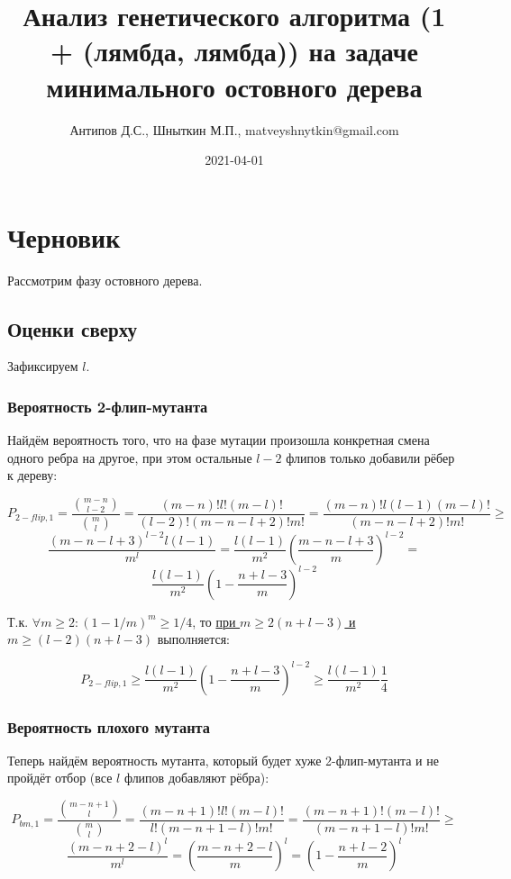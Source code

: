 \documentclass{article}
\title{Анализ генетического алгоритма (1 + (лямбда, лямбда)) на задаче минимального остовного дерева}
\date{2021-04-01}
\author{Антипов Д.С., Шныткин М.П., matveyshnytkin@gmail.com}
\begin{document}
  \maketitle
  \newpage
  

  \section{Черновик}
  
Рассмотрим фазу остовного дерева.

  \subsection{Оценки сверху}

Зафиксируем $l$.

  \subsubsection{Вероятность 2-флип-мутанта}

Найдём вероятность того, что на фазе мутации произошла конкретная смена одного ребра на другое, при этом остальные $l - 2$ флипов только добавили рёбер к дереву:

$$
P_{2-flip,1} = 
\frac{\binom{m - n}{l - 2}}{\binom{m}{l}} = 
\frac{(m - n)! l! (m - l)!}{(l - 2)! (m - n - l + 2)! m!} =
\frac{(m - n)! l (l - 1) (m - l)!}{(m - n - l + 2)! m!} \geq
$$
$$
\frac{(m - n - l + 3)^{l - 2} l (l - 1)}{m^l} =
\frac{l (l - 1)}{m^2} (\frac{m - n - l + 3}{m})^{l - 2} =
$$
$$
\frac{l (l - 1)}{m^2} (1 - \frac{n + l - 3}{m})^{l - 2}
$$

Т.к. $\forall m \geq 2 : (1 - 1/m)^m \geq 1/4$, то \underline{при $m \geq 2(n + l - 3)$  и $m \geq (l - 2)(n + l - 3)$} выполняется:

$$
P_{2-flip,1} \geq
\frac{l (l - 1)}{m^2} (1 - \frac{n + l - 3}{m})^{l - 2} \geq
\frac{l (l - 1)}{m^2} \frac{1}{4}
$$

  \subsubsection{Вероятность плохого мутанта}

Теперь найдём вероятность мутанта, который будет хуже 2-флип-мутанта и не пройдёт отбор (все $l$ флипов добавляют рёбра):

$$
P_{bm,1} = 
\frac{\binom{m - n + 1}{l}}{\binom{m}{l}} = 
\frac{(m - n + 1)! l! (m - l)!}{l! (m - n + 1 - l)! m!} =
\frac{(m - n + 1)! (m - l)!}{(m - n + 1 - l)! m!} \geq
$$
$$
\frac{(m - n + 2 - l)^l}{m^l} = 
(\frac{m - n + 2 - l}{m})^l =   
(1 - \frac{n + l - 2}{m})^l 
$$
\end{document}
